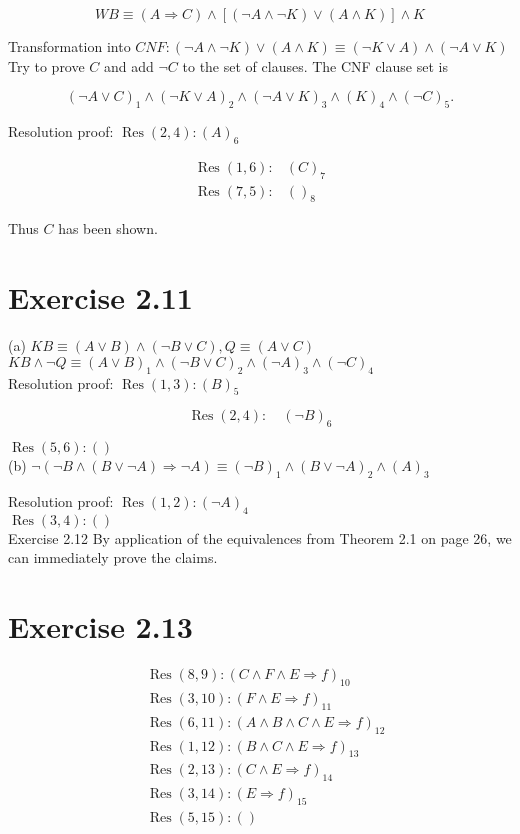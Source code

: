 \documentclass[10pt]{article}
\begin{document}
$$
W B \equiv(A \Rightarrow C) \wedge[(\neg A \wedge \neg K) \vee(A \wedge K)] \wedge K
$$

Transformation into $C N F:(\neg A \wedge \neg K) \vee(A \wedge K) \equiv(\neg K \vee A) \wedge(\neg A \vee K)$\\
Try to prove $C$ and add $\neg C$ to the set of clauses. The CNF clause set is

$$
(\neg A \vee C)_{1} \wedge(\neg K \vee A)_{2} \wedge(\neg A \vee K)_{3} \wedge(K)_{4} \wedge(\neg C)_{5} .
$$

Resolution proof: $\operatorname{Res}(2,4):(A)_{6}$

$$
\begin{array}{ll}
\operatorname{Res}(1,6): & (C)_{7} \\
\operatorname{Res}(7,5): & ()_{8}
\end{array}
$$

Thus $C$ has been shown.

\section*{Exercise 2.11}
(a) $K B \equiv(A \vee B) \wedge(\neg B \vee C), Q \equiv(A \vee C)$\\
$K B \wedge \neg Q \equiv(A \vee B)_{1} \wedge(\neg B \vee C)_{2} \wedge(\neg A)_{3} \wedge(\neg C)_{4}$\\
Resolution proof: $\operatorname{Res}(1,3):(B)_{5}$

$$
\operatorname{Res}(2,4): \quad(\neg B)_{6}
$$

$\operatorname{Res}(5,6):()$\\
(b) $\neg(\neg B \wedge(B \vee \neg A) \Rightarrow \neg A) \equiv(\neg B)_{1} \wedge(B \vee \neg A)_{2} \wedge(A)_{3}$

Resolution proof: $\operatorname{Res}(1,2):(\neg A)_{4}$\\
$\operatorname{Res}(3,4):()$\\
Exercise 2.12 By application of the equivalences from Theorem 2.1 on page 26, we can immediately prove the claims.

\section*{Exercise 2.13}
$$
\begin{aligned}
& \operatorname{Res}(8,9):(C \wedge F \wedge E \Rightarrow f)_{10} \\
& \operatorname{Res}(3,10):(F \wedge E \Rightarrow f)_{11} \\
& \operatorname{Res}(6,11):(A \wedge B \wedge C \wedge E \Rightarrow f)_{12} \\
& \operatorname{Res}(1,12):(B \wedge C \wedge E \Rightarrow f)_{13} \\
& \operatorname{Res}(2,13):(C \wedge E \Rightarrow f)_{14} \\
& \operatorname{Res}(3,14):(E \Rightarrow f)_{15} \\
& \operatorname{Res}(5,15):()
\end{aligned}
$$
\end{document}
